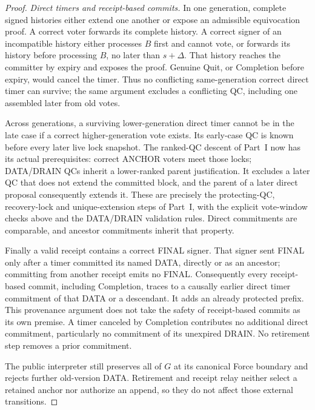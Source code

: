 \documentclass[11pt,a4paper]{article}
\begin{document}
\begin{proof}
\emph{Direct timers and receipt-based commits.}
In one generation, complete signed histories either extend one
another or expose an admissible equivocation proof.
A correct voter forwards its complete history. A correct signer of
an incompatible history either processes $B$ first and cannot vote,
or forwards its history before processing $B$, no later than
$s+\Delta$. That history reaches the committer by expiry and exposes
the proof. Genuine Quit, or Completion before expiry, would cancel
the timer. Thus no conflicting same-generation correct direct timer
can survive; the same argument excludes a conflicting QC, including
one assembled later from old votes.

Across generations, a surviving lower-generation direct timer cannot
be in the late case if a correct higher-generation vote exists.
Its early-case QC is known before every later live lock snapshot.
The ranked-QC descent of Part~I now has its actual prerequisites:
correct ANCHOR voters meet those locks; DATA/DRAIN QCs inherit a
lower-ranked parent justification. It excludes a later QC that does
not extend the committed block, and the parent of a later direct
proposal consequently extends it. These are precisely the
protecting-QC, recovery-lock and unique-extension steps of Part~I,
with the explicit vote-window checks above and the
DATA/DRAIN validation rules. Direct commitments are comparable, and
ancestor commitments inherit that property.

Finally a valid receipt contains a correct FINAL signer. That signer
sent FINAL only after a timer committed its named DATA, directly or
as an ancestor; committing from another receipt emits no FINAL.
Consequently every receipt-based commit, including Completion, traces
to a causally earlier direct timer commitment of that DATA or a
descendant. It adds an already protected prefix. This provenance
argument does not take the safety of receipt-based commits as its own
premise. A timer canceled by Completion contributes no additional
direct commitment, particularly no commitment of its unexpired DRAIN.
No retirement step removes a prior commitment.

The public interpreter still preserves all of $G$ at its canonical
Force boundary and rejects further old-version DATA. Retirement and
receipt relay neither select a retained anchor nor authorize an
append, so they do not affect those external transitions.
\end{proof}
\end{document}
